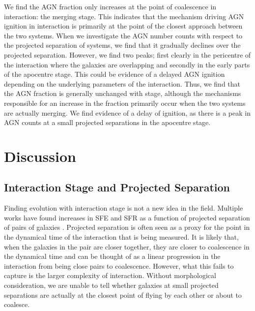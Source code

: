 We find the AGN fraction only increases at the point of coalescence in interaction: the merging stage. This indicates that the mechanism driving AGN ignition in interaction is primarily at the point of the closest approach between the two systems. When we investigate the AGN number counts with respect to the projected separation of systems, we find that it gradually declines over the projected separation. However, we find two peaks; first clearly in the pericentre of the interaction where the galaxies are overlapping and secondly in the early parts of the apocentre stage. This could be evidence of a delayed AGN ignition depending on the underlying parameters of the interaction. Thus, we find that the AGN fraction is generally unchanged with stage, although the mechanisms responsible for an increase in the fraction primarily occur when the two systems are actually merging. We find evidence of a delay of ignition, as there is a peak in AGN counts at a small projected separations in the apocentre stage.

\section{Discussion}\label{discussion}
\subsection{Interaction Stage and Projected Separation}
\noindent Finding evolution with interaction stage is not a new idea in the field. Multiple works have found increases in SFE and SFR as a function of projected separation of pairs of galaxies \citep{2000ApJ...530..660B, 2008AJ....135.1877E, 2013MNRAS.433L..59P}. Projected separation is often seen as a proxy for the point in the dynamical time of the interaction that is being measured. It is likely that, when the galaxies in the pair are closer together, they are closer to coalescence in the dynamical time and can be thought of as a linear progression in the interaction from being close pairs to coalescence. However, what this fails to capture is the larger complexity of interaction. Without morphological consideration, we are unable to tell whether galaxies at small projected separations are actually at the closest point of flying by each other or about to coalesce.

